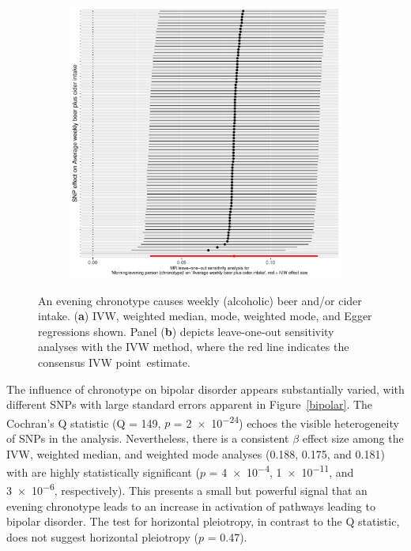 \documentclass[genes,article,accept,moreauthors,pdftex]{Definitions/mdpi}
\begin{document}
\begin{figure}[H]
{\begin{subfigure}{.5\linewidth}
	\includegraphics[width=0.95\linewidth,keepaspectratio]{Figs/Analysis2/Morning_evening_person_(chronotype)_vs_Average_weekly_beer_plus_cider_intake.LOOplots.pdf}
\caption{}
\label{beerLoo}
\end{subfigure}}
\caption{An evening chronotype causes weekly (alcoholic) beer and/or cider intake. (\textbf{a}) IVW, weighted median, mode, weighted mode, and Egger regressions shown. Panel (\textbf{b}) depicts leave-one-out sensitivity analyses with the IVW method, where the red line indicates the consensus IVW point~estimate.}
\label{beer}
\end{figure}
The influence of chronotype on bipolar disorder appears substantially varied, with different SNPs with large standard errors apparent in Figure~\ref{bipolar}. The Cochran's Q statistic (Q = 149, $p$ = \num{2e-24}) echoes the visible heterogeneity of SNPs in the analysis. Nevertheless, there is a consistent $\beta$ effect size among the IVW, weighted median, and weighted mode analyses (0.188, 0.175, and 0.181) with are highly statistically significant ($p$ = \num{4e-4}, \num{1e-11}, and \num{3e-6}, respectively). This presents a small but powerful signal that an evening chronotype leads to an increase in activation of pathways leading to bipolar disorder. The test for horizontal pleiotropy, in contrast to the Q statistic, does not suggest horizontal pleiotropy ($p$ = 0.47).
\end{document}
